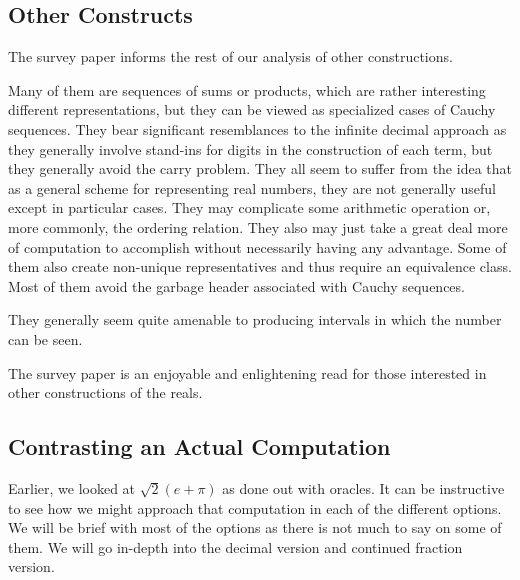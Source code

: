 \documentclass[12pt]{article}
\begin{document}
\subsection{Other Constructs}

The survey paper \cite{ittay-2015} informs the rest of our analysis of other constructions. 

Many of them are sequences of sums or products, which are rather interesting different representations, but they can be viewed as specialized cases of Cauchy sequences. They bear significant resemblances to the infinite decimal approach as they generally involve stand-ins for digits in the construction of each term, but they generally avoid the carry problem. They all seem to suffer from the idea that as a general scheme for representing real numbers, they are not generally useful except in particular cases. They may complicate some arithmetic operation or, more commonly, the ordering relation. They also may just take a great deal more of computation to accomplish without necessarily having any advantage. Some of them also create non-unique representatives and thus require an equivalence class. Most of them avoid the garbage header associated with Cauchy sequences. 

They generally seem quite amenable to producing intervals in which the number can be seen.

The survey paper is an enjoyable and enlightening read for those interested in other constructions of the reals. 

\subsection{Contrasting an Actual Computation}

Earlier, we looked at $\sqrt{2} (e + \pi) $ as done out with oracles. It can be instructive to see how we might approach that computation in each of the different options. We will be brief with most of the options as there is not much to say on some of them. We will go in-depth into the decimal version and continued fraction version. 
\end{document}
